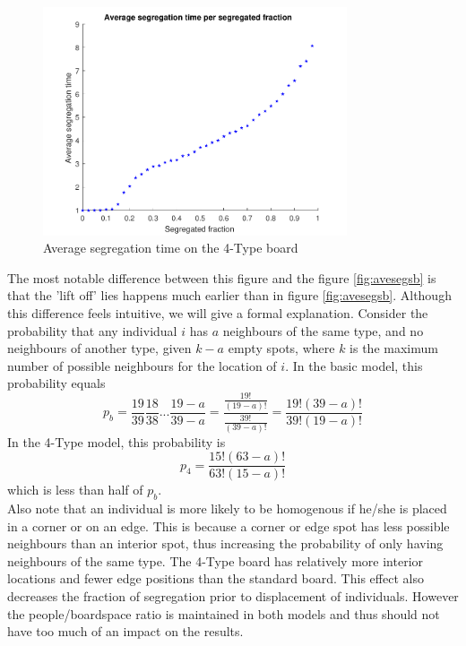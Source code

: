  \begin{figure}[H]
    \centering
    \includegraphics[width=0.8\textwidth]{aveseg_4b_2}
    \caption{Average segregation time on the 4-Type board}
    \label{fig:aveseg4b}
\end{figure}

The most notable difference between this figure and the figure \ref{fig:avesegsb} is that the 'lift off' lies happens much earlier than in figure \ref{fig:avesegsb}. 
Although this difference feels intuitive, we will give a formal explanation. 
Consider the probability that any individual $i$ has $a$ neighbours of the same type, and no neighbours of another type, given $k-a$ empty spots, where $k$ is the maximum number of possible neighbours for the location of $i$. 
In the basic model, this probability equals
\[
p_b = \frac{19}{39}\frac{18}{38}...\frac{19-a}{39-a} = \frac{\frac{19!}{(19-a)!}}{\frac{39!}{(39-a)!}} = \frac{19!(39-a)!}{39!(19-a)!}
\]
In the 4-Type model, this probability is
\[
p_4 = \frac{15!(63-a)!}{63!(15-a)!}
\]
which is less than half of $p_b$.\\

Also note that an individual is more likely to be homogenous if he/she is placed in a corner or on an edge. 
This is because a corner or edge spot has less possible neighbours than an interior spot, thus increasing the probability of only having neighbours of the same type. 
The 4-Type board has relatively more interior locations and fewer edge positions than the standard board. This effect also decreases the fraction of segregation prior to displacement of individuals.
However the people/boardspace ratio is maintained in both models and thus should not have too much of an impact on the results.\\

